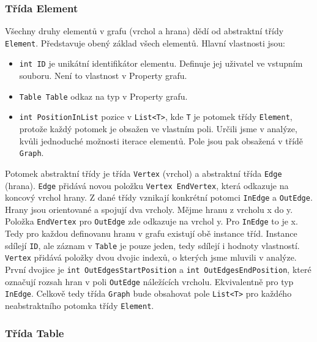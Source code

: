 \subsubsection{Třída Element}

Všechny druhy elementů v grafu (vrchol a hrana) dědí od abstraktní třídy \texttt{Element}.
Představuje obený základ všech elementů.
Hlavní vlastnosti jsou:
\begin{itemize}
\item \texttt{int ID} je unikátní identifikátor elementu. Definuje jej uživatel ve vstupním souboru. Není to vlastnost v Property grafu.
\item \texttt{Table Table} odkaz na typ v Property grafu.
\item \texttt{int PositionInList} pozice v \texttt{List<T>}, kde \texttt{T} je potomek třídy \texttt{Element}, protože každý potomek je obsažen ve vlastním poli.
Určili jsme v analýze, kvůli jednoduché možnosti iterace elementů.
Pole jsou pak obsažená v třídě \texttt{Graph}.
\end{itemize}

Potomek abstraktní třídy je třída \texttt{Vertex} (vrchol) a abstraktní třída \texttt{Edge} (hrana).
\texttt{Edge} přidává novou položku \texttt{Vertex EndVertex}, která odkazuje na koncový vrchol hrany.
Z dané třídy vznikají konkrétní potomci \texttt{InEdge} a \texttt{OutEdge}.
Hrany jsou orientované a spojují dva vrcholy.
Mějme hranu z vrcholu x do y.
Položka \texttt{EndVertex} pro \texttt{OutEdge} zde odkazuje na vrchol y.
Pro \texttt{InEdge} to je x.
Tedy pro každou definovanu hranu v grafu existují obě instance tříd. 
Instance sdílejí \texttt{ID}, ale záznam v \texttt{Table} je pouze jeden, tedy sdílejí i hodnoty vlastností. 
\texttt{Vertex} přidává položky dvou dvojic indexů, o kterých jsme mluvili v analýze.
První dvojice je \texttt{int OutEdgesStartPosition} a \texttt{int OutEdgesEndPosition}, které označují rozsah hran v poli \texttt{OutEdge} náležících vrcholu.
Ekvivalentně pro typ \texttt{InEdge}.
Celkově tedy třída \texttt{Graph} bude obsahovat pole \texttt{List<T>} pro každého neabstraktního potomka třídy \texttt{Element}.

\subsubsection{Třída Table}

